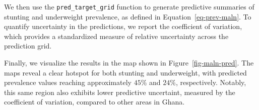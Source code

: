 \documentclass[
  letterpaper,
]{krantz}
\newenvironment{Shaded}{\begin{snugshade}}{\end{snugshade}}
\newcommand{\AttributeTok}[1]{\textcolor[rgb]{0.13,0.29,0.53}{#1}}
\newcommand{\CommentTok}[1]{\textcolor[rgb]{0.56,0.35,0.01}{\textit{#1}}}
\newcommand{\ControlFlowTok}[1]{\textcolor[rgb]{0.13,0.29,0.53}{\textbf{#1}}}
\newcommand{\DecValTok}[1]{\textcolor[rgb]{0.00,0.00,0.81}{#1}}
\newcommand{\FunctionTok}[1]{\textcolor[rgb]{0.13,0.29,0.53}{\textbf{#1}}}
\newcommand{\NormalTok}[1]{#1}
\newcommand{\OtherTok}[1]{\textcolor[rgb]{0.56,0.35,0.01}{#1}}
\newcommand{\SpecialCharTok}[1]{\textcolor[rgb]{0.81,0.36,0.00}{\textbf{#1}}}
\begin{document}
We then use the \texttt{pred\_target\_grid} function to generate
predictive summaries of stunting and underweight prevalence, as defined
in Equation~\ref{eq-prev-maln}. To quantify uncertainty in the
predictions, we report the coefficient of variation, which provides a
standardized measure of relative uncertainty across the prediction grid.

\begin{Shaded}
\end{Shaded}

Finally, we visualize the results in the map shown in
Figure~\ref{fig-maln-pred}. The maps reveal a clear hotspot for both
stunting and underweight, with predicted prevalence values reaching
approximately \(45\%\) and \(24\%\), respectively. Notably, this same
region also exhibits lower predictive uncertaint, measured by the
coefficient of variation, compared to other areas in Ghana.
\end{document}
